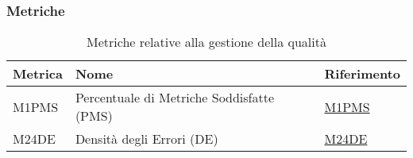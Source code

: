 \subsubsection{Metriche}
\begin{table}[H]
    \centering
    \begin{tabular}{|C{3cm}|C{3cm}|C{4cm}|}
    \hline
    Metrica & Nome & Riferimento \\
    \hline \hline
    M1PMS & Percentuale di Metriche Soddisfatte (PMS) &  \hyperlink{item:M1PMS}{\textcolor{linkcolor}{M1PMS}} \\
    M24DE & Densità degli Errori (DE) &  \hyperlink{item:M24DE}{\textcolor{linkcolor}{M24DE}} \\
    \hline
    \end{tabular}
    \caption{Metriche relative alla gestione della qualità}
\end{table}

